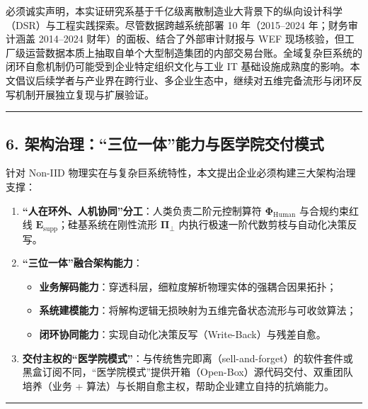 \documentclass[
]{article}
\providecommand{\tightlist}{%
  \setlength{\itemsep}{0pt}\setlength{\parskip}{0pt}}
\begin{document}
必须诚实声明，本实证研究系基于千亿级离散制造业大背景下的纵向设计科学（DSR）与工程实践探索。尽管数据跨越系统部署
10 年（2015--2024 年；财务审计涵盖 2014--2024
财年）的面板、结合了外部审计财报与 WEF
现场核验，但工厂级运营数据本质上抽取自单个大型制造集团的内部交易台账。全域复杂巨系统的闭环自愈机制仍可能受到企业特定组织文化与工业
IT
基础设施成熟度的影响。本文倡议后续学者与产业界在跨行业、多企业生态中，继续对五维完备流形与闭环反写机制开展独立复现与扩展验证。

\begin{center}\rule{0.5\linewidth}{0.5pt}\end{center}

\subsection{6.
架构治理：``三位一体''能力与医学院交付模式}\label{ux67b6ux6784ux6cbbux7406ux4e09ux4f4dux4e00ux4f53ux80fdux529bux4e0eux533bux5b66ux9662ux4ea4ux4ed8ux6a21ux5f0f}

针对 Non-IID
物理实在与复杂巨系统特性，本文提出企业必须构建三大架构治理支撑：

\begin{enumerate}
\def\labelenumi{\arabic{enumi}.}
\tightlist
\item
  \textbf{``人在环外、人机协同''分工}：人类负责二阶元控制算符
  \(\mathbf{\Phi}_{\mathrm{Human}}\) 与合规约束红线
  \(\mathbf{E}_{\mathrm{supp}}\)；硅基系统在刚性流形
  \(\mathbf{\Pi}_\bot\) 内执行极速一阶代数剪枝与自动化决策反写。
\item
  \textbf{``三位一体''融合架构能力}：

  \begin{itemize}
  \tightlist
  \item
    \textbf{业务解码能力}：穿透科层，细粒度解析物理实体的强耦合因果拓扑；
  \item
    \textbf{系统建模能力}：将解构逻辑无损映射为五维完备状态流形与可收敛算法；
  \item
    \textbf{闭环协同能力}：实现自动化决策反写（Write-Back）与残差自愈。
  \end{itemize}
\item
  \textbf{交付主权的``医学院模式''}：与传统售完即离（sell-and-forget）的软件套件或黑盒订阅不同，``医学院模式''提供开箱（Open-Box）源代码交付、双重团队培养（业务
  + 算法）与长期自愈主权，帮助企业建立自持的抗熵能力。
\end{enumerate}

\begin{center}\rule{0.5\linewidth}{0.5pt}\end{center}
\end{document}
